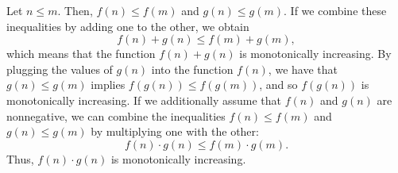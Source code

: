 Let $n\le m$.
Then, $f(n)\le f(m)$ and $g(n)\le g(m)$.
If we combine these inequalities by adding one to the other, we obtain
\[
    f(n)+g(n) \le f(m)+g(m),
\]
which means that the function $f(n)+g(n)$ is monotonically increasing.
By plugging the values of $g(n)$ into the function $f(n)$, we have that $g(n)\le g(m)$ implies $f(g(n))\le f(g(m))$, and so $f(g(n))$ is monotonically increasing.
If we additionally assume that $f(n)$ and $g(n)$ are nonnegative, we can combine the inequalities $f(n)\le f(m)$ and $g(n)\le g(m)$ by multiplying one with the other:
\[
    f(n)\cdot g(n)\le f(m)\cdot g(m).
\]
Thus, $f(n)\cdot g(n)$ is monotonically increasing.
